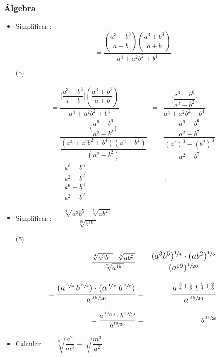 \documentclass[12pt, twocolumn, landscape, a4paper]{article}
\begin{document}
\subsubsection*{Álgebra}

\begin{itemize}
\item{Simplificar :
$$
= \dfrac{ ( \dfrac{a^3 - b^3}{a - b} ) (\dfrac{a^3 + b^3}{a + b}) }{a^4 + a^2b^2 + b^4}
$$
\begin{tasks}(5)
\end{tasks}

\begin{eqnarray*}
= \dfrac{\Big[\dfrac{a^3 - b^3}{a - b}\Big] (\dfrac{a^3 + b^3}{a + b}) }{a^4 + a^2b^2 + b^4} &=& \dfrac{\Big(\dfrac{a^{6} - b^{6}}{a^{2} - b^{2}}\Big)}{a^4 + a^2b^2 + b^4} \\[11pt]
= \dfrac{\Big(\dfrac{a^{6} - b^{6}}{a^{2} - b^{2}}\Big)}{\dfrac{(a^4 + a^2b^2 + b^4)(a^{2} - b^{2})}{(a^{2} - b^{2})}} &=& \dfrac{\dfrac{a^{6} - b^{6}}{a^{2} - b^{2}}}{\dfrac{(a^{2})^{3} - (b^{2})^{3}}{a^{2} - b^{2}}} \\[11pt]
= \dfrac{\;\;\dfrac{a^{6} - b^{6}}{a^{2} - b^{2}}\;\;}{\dfrac{a^{6} - b^{6}}{a^{2} - b^{2}}} &=& 1 
\end{eqnarray*}}
\item{Simplificar : \qquad$= \dfrac{\sqrt[4]{a^{3}b^{5}\;} \cdot \sqrt[5]{ab^{2}\;}}{\sqrt[20]{a^{19}\;}}$ %
\begin{tasks}(5)
\end{tasks}
\begin{eqnarray*}
= \dfrac{\sqrt[4]{a^{3}b^{5}\;} \cdot \sqrt[5]{ab^{2}\;}}{\sqrt[20]{a^{19}\;}} &=& \scalebox{1.25}{$\dfrac{(a^{3}b^{5})^{\sfrac{1}{4}} \cdot (ab^{2})^{\sfrac{1}{5}}}{(a^{19})^{\sfrac{1}{20}}}$} \\[11pt]
= \scalebox{1.25}{$\dfrac{(a^{\,\sfrac{3}{4}}\,b^{\,\sfrac{5}{4}})\cdot(a^{\,\sfrac{1}{\,5}}\,b^{\,\sfrac{2}{5}})}{a^{\,\sfrac{19}{20}}}$} &=& \scalebox{1.25}{$\dfrac{a^{\,\frac{3}{4} + \frac{1}{5}}\,b^{\,\frac{5}{4} + \frac{2}{5}}}{a^{\,\sfrac{19}{20}}}$} \\[10pt]
= \dfrac{a^{\,\sfrac{19}{20}} \cdot b^{\,\sfrac{33}{20}}}{a^{\sfrac{19}{20}}} &=& b^{\,\sfrac{33}{20}} 
\end{eqnarray*}
}
\item{Calcular : \quad$= \sqrt[8]{\dfrac{a^2}{m^3}} - \sqrt[8]{\dfrac{m^3}{a^2}}$
}
\end{itemize}
\end{document}

